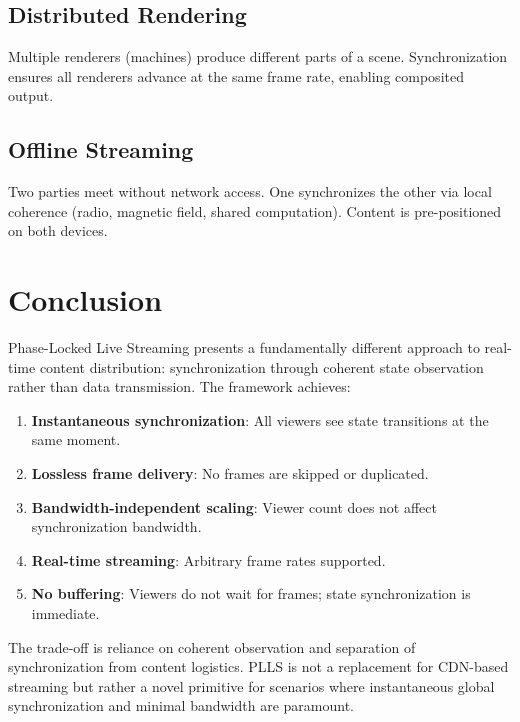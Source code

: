\documentclass[twocolumn,10pt,a4paper]{article}
\theoremstyle{plain}
\theoremstyle{definition}
\begin{document}
\subsection{Distributed Rendering}

Multiple renderers (machines) produce different parts of a scene. Synchronization ensures all renderers advance at the same frame rate, enabling composited output.

\subsection{Offline Streaming}

Two parties meet without network access. One synchronizes the other via local coherence (radio, magnetic field, shared computation). Content is pre-positioned on both devices.

\section{Conclusion}

Phase-Locked Live Streaming presents a fundamentally different approach to real-time content distribution: synchronization through coherent state observation rather than data transmission. The framework achieves:

\begin{enumerate}
\item \textbf{Instantaneous synchronization}: All viewers see state transitions at the same moment.
\item \textbf{Lossless frame delivery}: No frames are skipped or duplicated.
\item \textbf{Bandwidth-independent scaling}: Viewer count does not affect synchronization bandwidth.
\item \textbf{Real-time streaming}: Arbitrary frame rates supported.
\item \textbf{No buffering}: Viewers do not wait for frames; state synchronization is immediate.
\end{enumerate}

The trade-off is reliance on coherent observation and separation of synchronization from content logistics. PLLS is not a replacement for CDN-based streaming but rather a novel primitive for scenarios where instantaneous global synchronization and minimal bandwidth are paramount.



\end{document}
